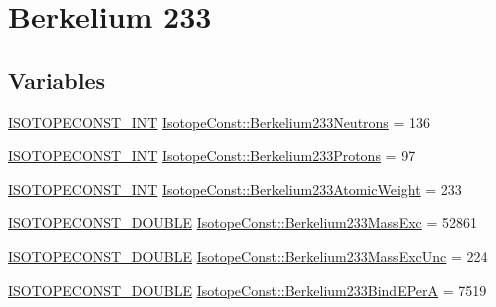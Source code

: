 \hypertarget{group___isotope_const-_berkelium-_bk233}{}\section{Berkelium 233}
\label{group___isotope_const-_berkelium-_bk233}
\subsection*{Variables}
\begin{DoxyCompactItemize}
\item 
\mbox{\hyperlink{group___isotope_const-_macros_ga5f18360b3e99483a35c32d789e62621c}{I\+S\+O\+T\+O\+P\+E\+C\+O\+N\+S\+T\+\_\+\+I\+NT}} \mbox{\hyperlink{group___isotope_const-_berkelium-_bk233_gaa40027bd7607b2b1672bcc52bf37046a}{Isotope\+Const\+::\+Berkelium233\+Neutrons}} = 136
\item 
\mbox{\hyperlink{group___isotope_const-_macros_ga5f18360b3e99483a35c32d789e62621c}{I\+S\+O\+T\+O\+P\+E\+C\+O\+N\+S\+T\+\_\+\+I\+NT}} \mbox{\hyperlink{group___isotope_const-_berkelium-_bk233_ga305e2ecd5cf50e3192bd662d53cd08e4}{Isotope\+Const\+::\+Berkelium233\+Protons}} = 97
\item 
\mbox{\hyperlink{group___isotope_const-_macros_ga5f18360b3e99483a35c32d789e62621c}{I\+S\+O\+T\+O\+P\+E\+C\+O\+N\+S\+T\+\_\+\+I\+NT}} \mbox{\hyperlink{group___isotope_const-_berkelium-_bk233_ga02af08fc7d4f04ec2a0e58977628bffe}{Isotope\+Const\+::\+Berkelium233\+Atomic\+Weight}} = 233
\item 
\mbox{\hyperlink{group___isotope_const-_macros_ga8f45a7272ce02c0b4c65c44636ed719a}{I\+S\+O\+T\+O\+P\+E\+C\+O\+N\+S\+T\+\_\+\+D\+O\+U\+B\+LE}} \mbox{\hyperlink{group___isotope_const-_berkelium-_bk233_ga491a28ec42df531fcf50d125080f7f87}{Isotope\+Const\+::\+Berkelium233\+Mass\+Exc}} = 52861
\item 
\mbox{\hyperlink{group___isotope_const-_macros_ga8f45a7272ce02c0b4c65c44636ed719a}{I\+S\+O\+T\+O\+P\+E\+C\+O\+N\+S\+T\+\_\+\+D\+O\+U\+B\+LE}} \mbox{\hyperlink{group___isotope_const-_berkelium-_bk233_gaa490832022268d13700e9ae80a6b547f}{Isotope\+Const\+::\+Berkelium233\+Mass\+Exc\+Unc}} = 224
\item 
\mbox{\hyperlink{group___isotope_const-_macros_ga8f45a7272ce02c0b4c65c44636ed719a}{I\+S\+O\+T\+O\+P\+E\+C\+O\+N\+S\+T\+\_\+\+D\+O\+U\+B\+LE}} \mbox{\hyperlink{group___isotope_const-_berkelium-_bk233_ga2a1a32752ba225ff221b020a86567caa}{Isotope\+Const\+::\+Berkelium233\+Bind\+E\+PerA}} = 7519
\item 

\end{DoxyCompactItemize}
